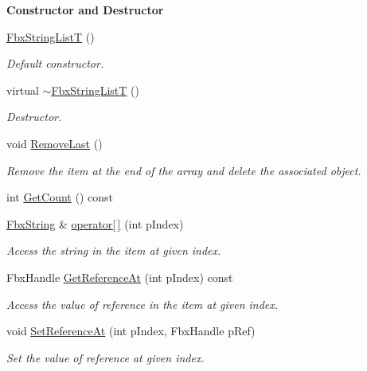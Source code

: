\begin{Indent}\textbf{ Constructor and Destructor}\par
\begin{DoxyCompactItemize}
\item 
\hyperlink{class_fbx_string_list_t_a23b6c1e63569190855827463157c6e89}{Fbx\+String\+ListT} ()
\begin{DoxyCompactList}\small\item\em Default constructor. \end{DoxyCompactList}\item 
virtual \hyperlink{class_fbx_string_list_t_a15d3f55726d1d30f0f87d7ade9bcc2ab}{$\sim$\+Fbx\+String\+ListT} ()
\begin{DoxyCompactList}\small\item\em Destructor. \end{DoxyCompactList}\item 
void \hyperlink{class_fbx_string_list_t_aa4a95c08fe634e37cf9ccc41b28a9d11}{Remove\+Last} ()
\begin{DoxyCompactList}\small\item\em Remove the item at the end of the array and delete the associated object. \end{DoxyCompactList}\item 
int \hyperlink{class_fbx_string_list_t_a4b881e2791c4b9a8b1abf5c845c3ddb1}{Get\+Count} () const
\item 
\hyperlink{class_fbx_string}{Fbx\+String} \& \hyperlink{class_fbx_string_list_t_a40ae970b4cbfd3df9117db1c3218b062}{operator\mbox{[}$\,$\mbox{]}} (int p\+Index)
\begin{DoxyCompactList}\small\item\em Access the string in the item at given index. \end{DoxyCompactList}\item 
Fbx\+Handle \hyperlink{class_fbx_string_list_t_ae3987a28b37de829cbf0bed42b5b5091}{Get\+Reference\+At} (int p\+Index) const
\begin{DoxyCompactList}\small\item\em Access the value of reference in the item at given index. \end{DoxyCompactList}\item 
void \hyperlink{class_fbx_string_list_t_a8ad989bfb74117a2bd948538ae1437ba}{Set\+Reference\+At} (int p\+Index, Fbx\+Handle p\+Ref)
\begin{DoxyCompactList}\small\item\em Set the value of reference at given index. \end{DoxyCompactList}\item 

\end{DoxyCompactItemize}
\end{Indent}
